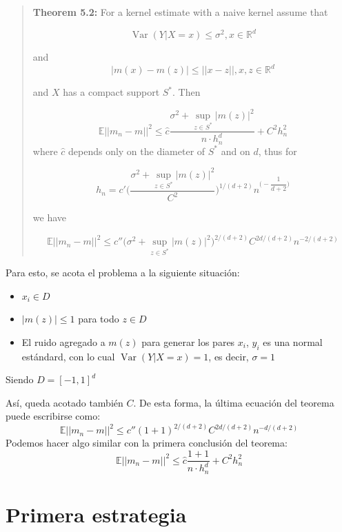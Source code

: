 \documentclass[12pt, a4paper]{article}
\begin{document}
\begin{quotation}
\textbf{Theorem  5.2:} For a kernel estimate with a naive kernel assume that

$$
\mathop{Var}(Y|X=x)\leq \sigma^2 ,x \in \mathds{R}^d
$$

and
$$
|m(x)-m(z)|\leq||x-z||, x,z \in \mathds{R}^d
$$

and $X$ has a compact support $S^{*}$. Then

$$
\mathds{E}|| m_n -m ||^2 \leq \hat{c} \dfrac{ \sigma^2 + \mathop{sup}_{z\in S^{*}} |m(z)|^2 }{n \cdot h_n^d} +C^2h_n^2
$$
where $\hat{c}$ depends only on the diameter of $S^{*}$ and on $d$, thus for

$$
h_n = c' \Bigg( \dfrac{\sigma^2 + \mathop{sup}_{z\in S^{*}}|m(z)|^2 }{C^2} \Bigg)^{1/(d+2)} n^{\Big (-\dfrac{1}{d+2}\Big )}
$$

we have

$$
\mathds{E}|| m_n - m ||^2 \leq c'' \Bigg (  \sigma^2 + \mathop{sup}_{z\in S^{*}} |m(z)|^2 \Bigg )^{2/(d+2)} C^{2d/(d+2)} n^{-2/(d+2)}
$$

\end{quotation}

Para esto, se acota el problema a la siguiente situación:
\begin{itemize}
  \item $ x_i \in D$
  \item $|m(z)|\leq 1 $ para todo $z\in D$
  \item El ruido agregado a $m(z)$ para generar los pares $x_i$, $y_i$ es una normal estándard, con lo cual $\mathop{Var}(Y|X=x) = 1$, es decir, $\sigma=1$
\end{itemize}

Siendo $D=[-1,1]^d$

Así, queda acotado también $C$. De esta forma, la última ecuación del teorema puede escribirse como:
$$
\mathds{E}||m_n - m||^2 \leq c'' (1+1)^{2/(d+2)} C^{2d/(d+2)} n^{-d/(d+2)}
$$
Podemos hacer algo similar con la primera conclusión del teorema:
$$
\mathds{E}|| m_n -m ||^2 \leq \hat{c} \dfrac{ 1 + 1 }{n \cdot h_n^d} +C^2h_n^2
$$
\section{Primera estrategia}
\end{document}
